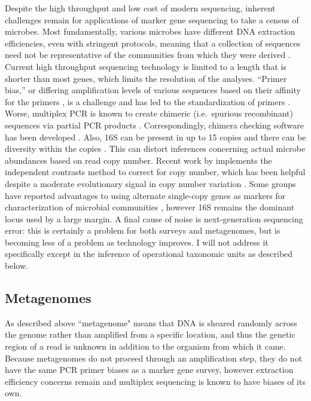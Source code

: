 \documentclass{amsart}
\begin{document}
Despite the high throughput and low cost of modern sequencing, inherent challenges remain for applications of marker gene sequencing to take a census of microbes.
Most fundamentally, various microbes have different DNA extraction efficiencies, even with stringent protocols, meaning that a collection of sequences need not be representative of the communities from which they were derived \citep{morgan2010metagenomic}.
Current high throughput sequencing technology is limited to a length that is shorter than most genes, which limits the resolution of the analyses.
``Primer bias,'' or differing amplification levels of various sequences based on their affinity for the primers \citep{suzuki1996bias,polz1998bias}, is a challenge and has led to the standardization of primers \citep{methe2012framework}.
Worse, multiplex PCR is known to create chimeric (i.e.\ spurious recombinant) sequences via partial PCR products \citep{hugenholtz2003chimeric,ashelford2005least,haas2011chimeric,schloss2011reducing}.
Correspondingly, chimera checking software has been developed \citep[including][]{ashelford2006new,edgar2011uchime}.
Also, 16S can be present in up to 15 copies and there can be diversity within the copies \citep{klappenbach2001rrndb}.
This can distort inferences concerning actual microbe abundances based on read copy number.
Recent work by \citet{kembel2012incorporating} implements the independent contrasts method \citep{felsenstein1985phylogenies} to correct for copy number, which has been helpful despite a moderate evolutionary signal in copy number variation \citep{klappenbach2000rrna}.
Some groups have reported advantages to using alternate single-copy genes as markers for characterization of microbial communities \citep[e.g.][]{mcnabb2004hsp65,case2007rpob}, however 16S remains the dominant locus used by a large margin.
A final cause of noise is next-generation sequencing error: this is certainly a problem for both surveys and metagenomes, but is becoming less of a problem as technology improves.
I will not address it specifically except in the inference of operational taxonomic units as described below.

\subsection{Metagenomes}
As described above ``metagenome" means that DNA is sheared randomly across the genome rather than amplified from a specific location, and thus the genetic region of a read is unknown in addition to the organism from which it came.
Because metagenomes do not proceed through an amplification step, they do not have the same PCR primer biases as a marker gene survey, however extraction efficiency concerns remain and multiplex sequencing is known to have biases of its own.
\end{document}
